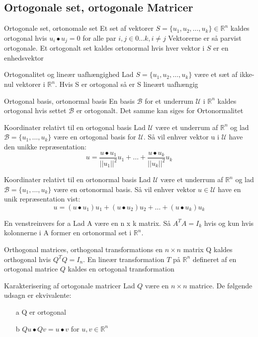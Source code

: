 \documentclass[a4paper,fleqn]{article}
\newcommand{\RR}{\mathbb{R}}
\newcommand{\U}{\mathcal{U}}
\newcommand{\B}{\mathcal{B}}
\begin{document}
	\subsection{Ortogonale set, ortogonale Matricer}
	\begin{definition}{Ortogonale set, ortonomale set}{}
		Et set af vektorer $S = \{u_1, u_2, \dots, u_k\} \in \RR^n$ kaldes ortogonal hvis
		$u_i \bullet u_j = 0$ for alle par $i,j \in 0\dots k, i \neq j$
		Vektorerne er så parvist ortogonale. Et ortogonalt set  kaldes ortonormal hvis
		hver vektor i $S$ er en enhedsvektor
	\end{definition}
	\begin{theorem}{Ortogonalitet og lineær uafhængighed}{}
		Lad $S = \{u_1, u_2, \dots, u_k\}$ være et sæt af ikke-nul vektorer i $\RR^n$. Hvis
		S er ortogonal så er S lineært uafhængig
	\end{theorem}
	\begin{definition}{Ortogonal basis, ortonormal basis}{}
		En basis $\B$ for et underrum $\U$ i $\RR^n$ kaldes ortogonal hvis settet $\B$ er
		ortogonalt. Det samme kan siges for Ortonormalitet
	\end{definition}
	\begin{theorem}{Koordinater relativt til en ortogonal basis}{}
		Lad $\U$ være et underrum af $\RR^n$ og lad $\B = \{u_1, \dots, u_k\}$ være en
		ortogonal basis for $\U$. Så vil enhver vektor u i $\U$ have den unikke
		repræsentation:
		\[ u = \frac{u\bullet u_1}{||u_1||^2}u_1+\dots+\frac{u\bullet u_k}{||u_k||^2}u_k\]
	\end{theorem}
	\begin{theorem}{Koordinater relativt til en ortonormal basis}{}
		Lad $\U$ være et underrum af $\RR^n$ og lad $\B = \{u_1, \dots, u_k\}$ være en
		ortonormal basis. Så vil enhver vektor $u \in \U$ have en unik repræsentation vist:
		\[ u = (u\bullet u_1)u_1 + (u\bullet u_2)u_2 + \dots + (u\bullet u_k)u_k \]
	\end{theorem}
	\begin{theorem}{En venstreinvers for a}{}
		Lad A være en n x k matrix. Så $A^TA=I_k$ hvis og kun hvis kolonnerne i A former en
		ortonormal set i $\RR^n$.
	\end{theorem}
	\begin{definition}{Orthogonal matrices, orthogonal transformations}{}
		en $n\times n$ matrix Q kaldes orthogonal hvis $Q^TQ = I_n$. En lineær
		transformation $T$ på $\RR^n$ defineret af en ortogonal matrice $Q$ kaldes en
		ortogonal transformation
	\end{definition}
	\begin{theorem}{Karakterisering af ortogonale matricer}{}
		Lad $Q$ være en $n \times n$ matrice. De følgende udsagn er ekvivalente:
		\begin{itemize}
			\item[a] Q er ortogonal
			\item[b] $Qu\bullet Qv = u\bullet v$ for $u,v \in \RR^n$
		\end{itemize}
	\end{theorem}
\end{document}
